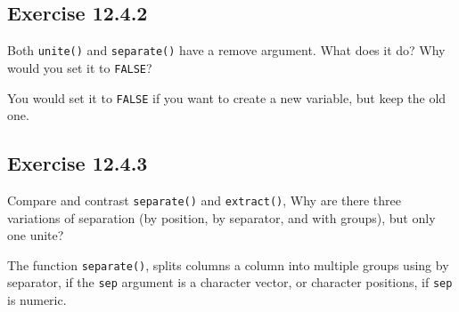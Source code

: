 \documentclass[]{book}
\newenvironment{Shaded}{\begin{snugshade}}{\end{snugshade}}
\newcommand{\CommentTok}[1]{\textcolor[rgb]{0.56,0.35,0.01}{\textit{#1}}}
\newcommand{\DataTypeTok}[1]{\textcolor[rgb]{0.13,0.29,0.53}{#1}}
\newcommand{\DecValTok}[1]{\textcolor[rgb]{0.00,0.00,0.81}{#1}}
\newcommand{\KeywordTok}[1]{\textcolor[rgb]{0.13,0.29,0.53}{\textbf{#1}}}
\newcommand{\NormalTok}[1]{#1}
\newcommand{\OperatorTok}[1]{\textcolor[rgb]{0.81,0.36,0.00}{\textbf{#1}}}
\newcommand{\StringTok}[1]{\textcolor[rgb]{0.31,0.60,0.02}{#1}}
\theoremstyle{plain}
\theoremstyle{remark}
\theoremstyle{definition}
\theoremstyle{definition}
\theoremstyle{definition}
\theoremstyle{remark}
\begin{document}
\hypertarget{exercise-12.4.2}{%
\subsection*{\texorpdfstring{Exercise
{12.4.2}}{Exercise 12.4.2}}\label{exercise-12.4.2}}

Both \texttt{unite()} and \texttt{separate()} have a remove argument.
What does it do? Why would you set it to \texttt{FALSE}?

You would set it to \texttt{FALSE} if you want to create a new variable,
but keep the old one.

\hypertarget{exercise-12.4.3}{%
\subsection*{\texorpdfstring{Exercise
{12.4.3}}{Exercise 12.4.3}}\label{exercise-12.4.3}}

Compare and contrast \texttt{separate()} and \texttt{extract()}, Why are
there three variations of separation (by position, by separator, and
with groups), but only one unite?

The function \texttt{separate()}, splits columns a column into multiple
groups using by separator, if the \texttt{sep} argument is a character
vector, or character positions, if \texttt{sep} is numeric.

\begin{Shaded}
\end{Shaded}
\end{document}
